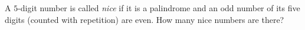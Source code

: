 A $5$-digit number is called \emph{nice} if it is a palindrome and an odd number of its five digits (counted with repetition) are even. How many nice numbers are there?
